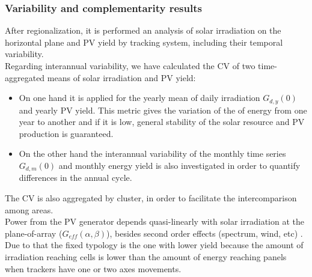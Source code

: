 \subsubsection{Variability and complementarity results}

After regionalization, it is performed an analysis of solar irradiation on the horizontal plane and PV yield by tracking system, including their temporal variability.\\

Regarding interannual variability, we have calculated the CV of two time-aggregated means of solar irradiation and PV yield:

\begin{itemize}
\item On one hand it is applied for the yearly mean of daily irradiation $G_{d,y}(0)$ and yearly PV yield. This metric gives the variation of the of energy from one year to another and if it is low, general stability of the solar resource and PV production is guaranteed. 
\item On the other hand the interannual variability of the monthly time series $G_{d,m}(0)$ and monthly energy yield is also investigated in order to quantify differences in the annual cycle. 
\end{itemize}

The CV is also aggregated by cluster, in order to facilitate the intercomparison among areas.\\


Power from the PV generator depends quasi-linearly with solar irradiation at the plane-of-array ($G_{eff}(\alpha,\beta)$), besides second order effects (spectrum, wind, etc) \citep{Perpinan2007} . Due to that the fixed typology is the one with lower yield because the amount of irradiation reaching cells is lower than the amount of energy reaching panels when trackers have one or two axes movements.

